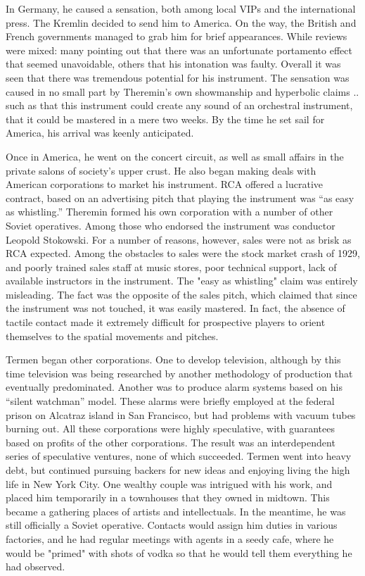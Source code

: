 In Germany, he caused a sensation, both among local VIPs and the international press. The Kremlin decided to send him to America. On the way, the British and French governments managed to grab him for brief appearances. While reviews were mixed: many pointing out that there was an unfortunate portamento effect that seemed unavoidable, others that his intonation was faulty. Overall it was seen that there was tremendous potential for his instrument. The sensation was caused in no small part by Theremin's own showmanship and hyperbolic claims .. such as that this instrument could create any sound of an orchestral instrument, that it could be mastered in a mere two weeks. By the time he set sail for America, his arrival was keenly anticipated.

Once in America, he went on the concert circuit, as well as small affairs in the private salons of society's upper crust. He also began making deals with American corporations to market his instrument. RCA offered a lucrative contract, based on an advertising pitch that playing the instrument was ``as easy as whistling.'' Theremin formed his own corporation with a number of other Soviet operatives. Among those who endorsed the instrument was conductor Leopold Stokowski. For a number of reasons, however, sales were not as brisk as RCA expected. Among the obstacles to sales were the stock market crash of 1929, and poorly trained sales staff at music stores, poor technical support, lack of available instructors in the instrument. The "easy as whistling" claim was entirely misleading. The fact was the opposite of the sales pitch, which claimed that since the instrument was not touched, it was easily mastered. In fact, the absence of tactile contact made it extremely difficult for prospective players to orient themselves to the spatial movements and pitches.

Termen began other corporations. One to develop television, although by this time television was being researched by another methodology of production that eventually predominated. Another was to produce alarm systems based on his ``silent watchman'' model. These alarms were briefly employed at the federal prison on Alcatraz island in San Francisco, but had problems with vacuum tubes burning out. All these corporations were highly speculative, with guarantees based on profits of the other corporations. The result was an interdependent series of speculative ventures, none of which succeeded. Termen went into heavy debt, but continued pursuing backers for new ideas and enjoying living the high life in New York City. One wealthy couple was intrigued with his work, and placed him temporarily in a townhouses that they owned in midtown. This became a gathering places of artists and intellectuals. In the meantime, he was still officially a Soviet operative. Contacts would assign him duties in various factories, and he had regular meetings with agents in a seedy cafe, where he would be "primed" with shots of vodka so that he would tell them everything he had observed.

